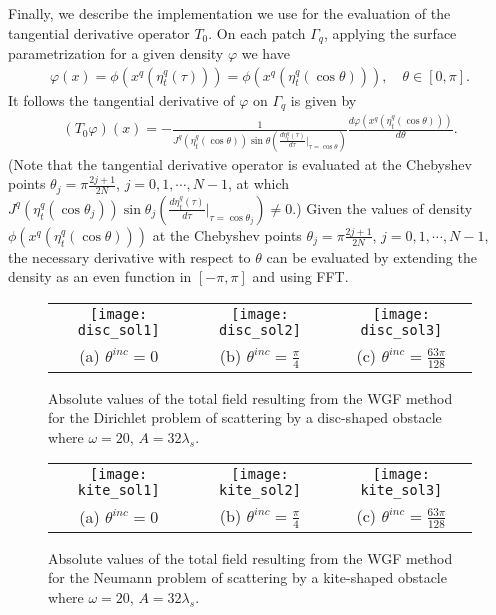 \documentclass[10pt]{article}
\numberwithin{equation}{section}
\newcommand{\ben}{\begin{eqnarray*}}
\newcommand{\enn}{\end{eqnarray*}}
\begin{document}
Finally, we describe the implementation we use for the evaluation of
the tangential derivative operator $T_0$. On each patch $\Gamma_q$,
applying the surface parametrization for a given density $\varphi$ we
have \ben
\varphi(x)=\phi(x^q(\eta_t^q(\tau)))=\phi(x^q(\eta_t^q(\cos\theta))),
\quad\theta\in[0,\pi].  \enn It follows the tangential derivative of
$\varphi$ on $\Gamma_q$ is given by \ben
(T_0\varphi)(x)=-\frac{1}{J^q(\eta_t^q(\cos\theta)) \sin\theta
  \left(\frac{d\eta_t^q(\tau)}{d\tau}\Big|_{\tau=\cos\theta}\right)}
\frac{d\varphi(x^q(\eta_t^q(\cos\theta)))}{d\theta}.  \enn (Note that
the tangential derivative operator is evaluated at the Chebyshev
points $\theta_j=\pi\frac{2j+1}{2N}$, $j=0,1,\cdots,N-1$, at which
$J^q(\eta_t^q(\cos\theta_j)) \sin\theta_j
\left(\frac{d\eta_t^q(\tau)}{d\tau}\Big|_{\tau=\cos\theta_j}\right)\ne
0$.) Given the values of density $\phi(x^q(\eta_t^q(\cos\theta)))$ at
the Chebyshev points $\theta_j=\pi\frac{2j+1}{2N}$,
$j=0,1,\cdots,N-1$, the necessary derivative with respect to $\theta$
can be evaluated by extending the density as an even function in
$[-\pi,\pi]$ and using FFT.

\begin{figure}[htbp]
\centering
\begin{tabular}{ccc}
\texttt{[image: disc\_sol1]} &
\texttt{[image: disc\_sol2]} &
\texttt{[image: disc\_sol3]} \\
(a) $\theta^{inc}=0$ & (b) $\theta^{inc}=\frac{\pi}{4}$ & (c) $\theta^{inc}=\frac{63\pi}{128}$ \\
\end{tabular}
\caption{Absolute values of the total field  resulting from the WGF method for the Dirichlet problem of scattering by a disc-shaped obstacle where $\omega=20$, $A=32\lambda_s$.}
\label{Figure2D.2}
\end{figure}

\begin{figure}[htbp]
\centering
\begin{tabular}{ccc}
\texttt{[image: kite\_sol1]} &
\texttt{[image: kite\_sol2]} &
\texttt{[image: kite\_sol3]} \\
(a) $\theta^{inc}=0$ & (b) $\theta^{inc}=\frac{\pi}{4}$ & (c) $\theta^{inc}=\frac{63\pi}{128}$ \\
\end{tabular}
\caption{Absolute values of the total field  resulting from the WGF method for the Neumann problem of scattering by a kite-shaped obstacle where $\omega=20$, $A=32\lambda_s$.}
\label{Figure2D.3}
\end{figure}
\end{document}
